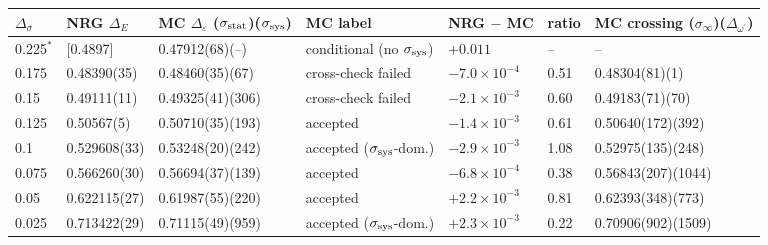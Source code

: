 \begin{tabular}{@{}lllllll@{}}
\toprule
$\Delta_\sigma$ & NRG $\Delta_E$ & MC $\Delta_\varepsilon$ ($\sigma_{\rm stat}$)($\sigma_{\rm sys}$) & MC label & NRG $-$ MC & ratio & MC crossing ($\sigma_\infty$)($\Delta_{\omega^\prime}$)\\
\midrule
0.225$^\ast$ & [0.4897] & 0.47912(68)(--) & conditional (no $\sigma_{\rm sys}$) & $+0.011$ & -- & --\\
0.175 & 0.48390(35) & 0.48460(35)(67) & cross-check failed & $-7.0\times10^{-4}$ & 0.51 & 0.48304(81)(1)\\
0.15 & 0.49111(11) & 0.49325(41)(306) & cross-check failed & $-2.1\times10^{-3}$ & 0.60 & 0.49183(71)(70)\\
0.125 & 0.50567(5) & 0.50710(35)(193) & accepted & $-1.4\times10^{-3}$ & 0.61 & 0.50640(172)(392)\\
0.1 & 0.529608(33) & 0.53248(20)(242) & accepted ($\sigma_{\rm sys}$-dom.) & $-2.9\times10^{-3}$ & 1.08 & 0.52975(135)(248)\\
0.075 & 0.566260(30) & 0.56694(37)(139) & accepted & $-6.8\times10^{-4}$ & 0.38 & 0.56843(207)(1044)\\
0.05 & 0.622115(27) & 0.61987(55)(220) & accepted & $+2.2\times10^{-3}$ & 0.81 & 0.62393(348)(773)\\
0.025 & 0.713422(29) & 0.71115(49)(959) & accepted ($\sigma_{\rm sys}$-dom.) & $+2.3\times10^{-3}$ & 0.22 & 0.70906(902)(1509)\\
\bottomrule
\end{tabular}

